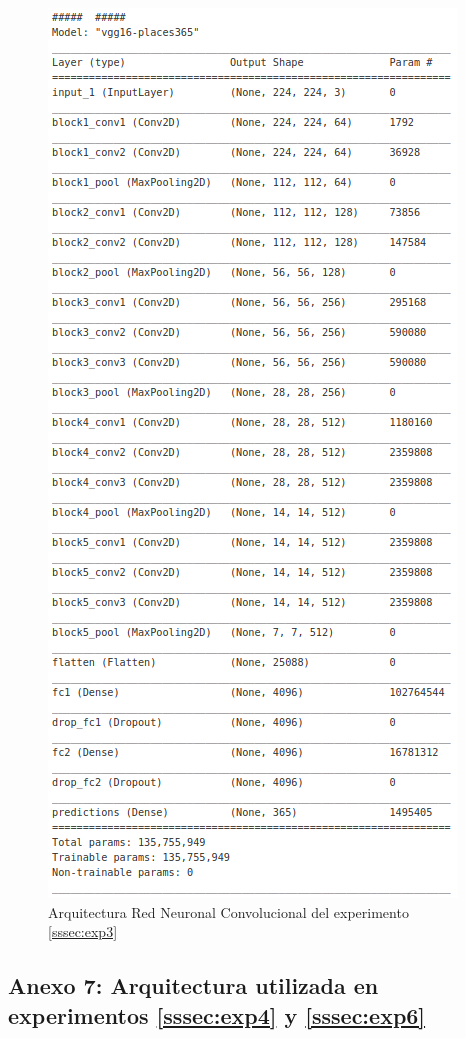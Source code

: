 \begin{figure}[!htb]
	\centering
	\includegraphics[width=0.7\linewidth]{images/architecture_exp3}
	\caption{Arquitectura Red Neuronal Convolucional del experimento \ref{sssec:exp3}}
	\label{fig:architectureexp3}
\end{figure}


\subsection{Anexo 7: Arquitectura utilizada en experimentos \ref{sssec:exp4} y \ref{sssec:exp6}}\label{ssec:anexo7}

